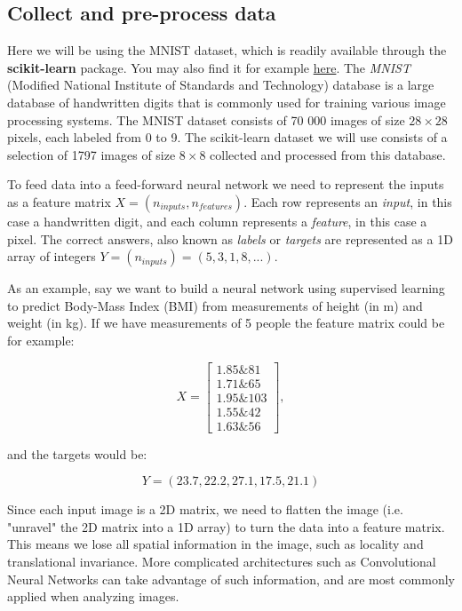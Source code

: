 \documentclass[%
oneside,                 %
final,                   %
10pt]{article}
\begin{document}
\noindent
\subsection*{Collect and pre-process data}

Here we will be using the MNIST dataset, which is readily available through the \textbf{scikit-learn}
package. You may also find it for example \href{{http://yann.lecun.com/exdb/mnist/}}{here}.  
The \emph{MNIST} (Modified National Institute of Standards and Technology) database is a large database
of handwritten digits that is commonly used for training various image processing systems.  
The MNIST dataset consists of 70 000 images of size $28\times 28$ pixels, each labeled from 0 to 9.  
The scikit-learn dataset we will use consists of a selection of 1797 images of size $8\times 8$ collected and processed from this database.  

To feed data into a feed-forward neural network we need to represent
the inputs as a feature matrix $X = (n_{inputs}, n_{features})$.  Each
row represents an \emph{input}, in this case a handwritten digit, and
each column represents a \emph{feature}, in this case a pixel.  The
correct answers, also known as \emph{labels} or \emph{targets} are
represented as a 1D array of integers 
$Y = (n_{inputs}) = (5, 3, 1, 8,...)$.

As an example, say we want to build a neural network using supervised learning to predict Body-Mass Index (BMI) from
measurements of height (in m)  
and weight (in kg). If we have measurements of 5 people the feature matrix could be for example:  

$$ X = \begin{bmatrix}
1.85 {\&} 81\\
1.71 {\&} 65\\
1.95 {\&} 103\\
1.55 {\&} 42\\
1.63 {\&} 56
\end{bmatrix} ,$$  

and the targets would be:  

$$ Y = (23.7, 22.2, 27.1, 17.5, 21.1) $$  

Since each input image is a 2D matrix, we need to flatten the image
(i.e. "unravel" the 2D matrix into a 1D array) to turn the data into a
feature matrix. This means we lose all spatial information in the
image, such as locality and translational invariance. More complicated
architectures such as Convolutional Neural Networks can take advantage
of such information, and are most commonly applied when analyzing
images.
\end{document}
